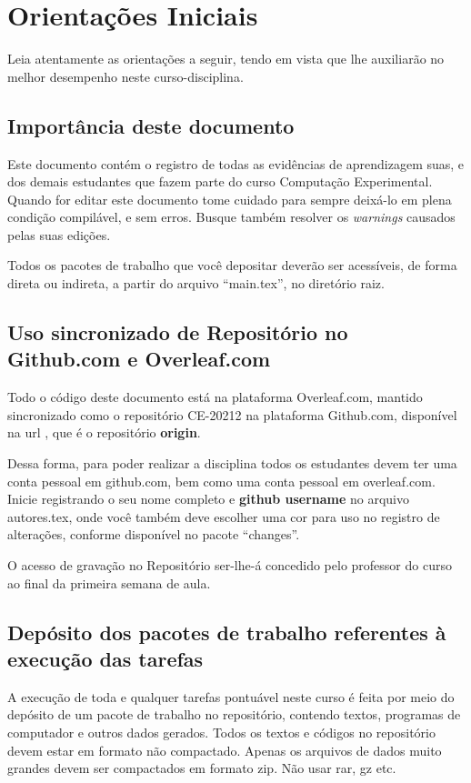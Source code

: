 \chapter{Orientações Iniciais}

Leia atentamente as orientações a seguir, tendo em vista que lhe auxiliarão no melhor desempenho neste curso-disciplina. 

\section{Importância deste documento}

Este documento contém o registro de todas as evidências de aprendizagem suas, e dos demais estudantes que fazem parte do curso Computação Experimental.
Quando for editar este documento tome cuidado para sempre deixá-lo em plena condição compilável, e sem erros. Busque também resolver os \textit{warnings} causados pelas suas edições.

Todos os pacotes de trabalho que você depositar deverão ser acessíveis, de forma direta ou indireta, a partir do arquivo ``main.tex'', no diretório raiz.

\section{Uso sincronizado de Repositório no Github.com e Overleaf.com}

Todo o código deste documento está na plataforma Overleaf.com, mantido sincronizado como o repositório CE-20212 na plataforma Github.com, disponível na url \url{}, que é o repositório \textbf{origin}.

Dessa forma, para poder realizar a disciplina todos os estudantes devem ter uma conta pessoal em github.com, bem como uma conta pessoal em overleaf.com. Inicie registrando o seu nome completo e \textbf{github username} no arquivo autores.tex, onde você também deve escolher uma cor para uso no registro de alterações, conforme disponível no pacote ``changes''.

O acesso de gravação no Repositório ser-lhe-á concedido pelo professor do curso ao final da primeira semana de aula.

\section{Depósito dos pacotes de trabalho referentes à execução das tarefas}

A execução de toda e qualquer tarefas pontuável neste curso é feita por meio do depósito de um pacote de trabalho no repositório, contendo textos, programas de computador e outros dados gerados. Todos os textos e códigos no repositório devem estar em formato não compactado. Apenas os arquivos de dados muito grandes devem ser compactados em formato zip. Não usar rar, gz etc. 


